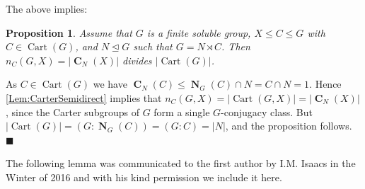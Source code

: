 \documentclass[10pt,a4paper]{amsart}
\numberwithin{equation}{section}
\DeclareMathOperator{\N}{\mathbf{N}}
\DeclareMathOperator{\cart}{Cart}
\DeclareMathOperator{\cent}{\mathbf{C}}
\newcommand{\card}[1]{\left\lvert{#1}\right\rvert}
\renewcommand{\leq}{\leqslant}
\newenvironment{proofof}{{\bf {Proof.} }}{\hfill $\blacksquare$ \\}
\newtheorem{proposition}[theorem]{Proposition}
\begin{document}
The above implies:

\begin{proposition}\label{Prop:SemidirWithCart}
Assume that $G$ is a finite soluble group, $X \leq C \leq G$ with $C \in \cart(G)$, 
and $N \unlhd G$ such that $G = N \rtimes C$. 
Then $n_C(G, X) = \card{\cent_N(X)}$  divides $\card{\cart(G)}$.
\end{proposition}

\begin{proofof}
As $C \in \cart(G)$ we have $\cent_N(C) \leq \N_G(C) \cap N  = C \cap N = 1$. 
Hence \autoref{Lem:CarterSemidirect} implies that $n_C(G, X) =  \card{\cart(G, X)}  = \card{\cent_N(X)}$, 
since the Carter subgroups of $G$ form a single $G$-conjugacy class. 
But $\card{\cart(G)} = (G : \N_G(C)) = (G : C) = |N| $, 
and the proposition follows.
\end{proofof}



The following lemma was communicated to the first author by I.M. Isaacs in the Winter of 2016 and with his kind permission we include it here.
\end{document}
